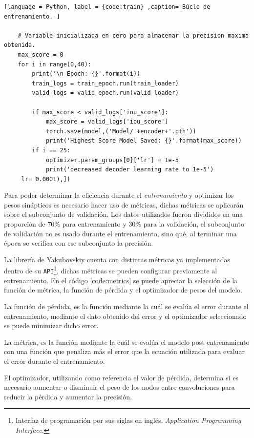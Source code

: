 \begin{lstlisting}[language = Python, label = {code:train} ,caption= Búcle de entrenamiento. ]

    # Variable inicializada en cero para almacenar la precision maxima obtenida.
    max_score = 0 
    for i in range(0,40):
        print('\n Epoch: {}'.format(i))
        train_logs = train_epoch.run(train_loader)
        valid_logs = valid_epoch.run(valid_loader)

        if max_score < valid_logs['iou_score']:
            max_score = valid_logs['iou_score']
            torch.save(model,('Model/'+encoder+'.pth'))
            print('Highest Score Model Saved: {}'.format(max_score))
        if i == 25:
            optimizer.param_groups[0]['lr'] = 1e-5
            print('decreased decoder learning rate to 1e-5')
     lr= 0.0001),])
\end{lstlisting}

Para poder determinar la eficiencia durante el \emph{entrenamiento} y optimizar los pesos sinápticos es necesario hacer uso de métricas, dichas métricas se aplicarán sobre el subconjunto de validación. Los datos utilizados fueron divididos en una proporción de $70\%$ para entrenamiento y $30\%$ para la validación, el subconjunto de validación no es usado durante el entrenamiento, sino qué, al terminar una época se verifíca con ese subconjunto la precisión.

La librería de Yakubovskiy \citep{Yakubovskiy:2019} cuenta con distintas métricas ya implementadas dentro de su \texttt{API}\footnote{Interfaz de programación por sus siglas en inglés, \emph{Application Programming Interface}.}, dichas métricas se pueden configurar previamente al entrenamiento. En el código \ref{code:metrics} se puede apreciar la selección de la función de métrica, la función de pérdida y el optimizador de pesos del modelo.

La función de pérdida, es la función mediante la cuál se evalúa el error durante el entrenamiento, mediante el dato obtenido del error y el optimizador seleccionado se puede minimizar dicho error.

La métrica, es la función mediante la cuál se evalúa el modelo post-entrenamiento con una función que penaliza más el error que la ecuación utilizada para evaluar el error durante el entrenamiento.

El optimizador, utilizando como referencia el valor de pérdida, determina si es necesario aumentar o disminuir el peso de los nodos entre convoluciones para reducir la pérdida y aumentar la precisión.

